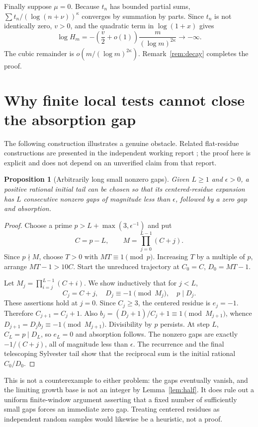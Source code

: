 \documentclass[11pt,a4paper]{article}
\newtheorem{proposition}[theorem]{Proposition}
\theoremstyle{remark}\newtheorem{remark}[theorem]{Remark}
\begin{document}
Finally suppose $\mu=0$. Because $t_n$ has bounded partial sums,
$\sum t_n/(\log(n+\nu))^\kappa$ converges by summation by parts.
Since $t_n$ is not identically zero, $v>0$, and the quadratic term in
$\log(1+x)$ gives
\[
 \log H_m=-\left(\frac v2+o(1)\right)
                  \frac m{(\log m)^{2\kappa}}\longrightarrow-\infty.
\]
The cubic remainder is $o(m/(\log m)^{2\kappa})$.
Remark~\ref{rem:decay} completes the proof.

\section{Why finite local tests cannot close the absorption gap}
The following construction illustrates a genuine obstacle. Related
flat-residue constructions are presented in the independent working report
\cite{flat}; the proof here is explicit and does not depend on an unverified
claim from that report.

\begin{proposition}[Arbitrarily long small nonzero gaps]\label{prop:flat}
Given $L\ge1$ and $\epsilon>0$, a positive rational initial tail can be
chosen so that its centered-residue expansion has $L$ consecutive nonzero
gaps of magnitude less than $\epsilon$, followed by a zero gap and absorption.
\end{proposition}
\begin{proof}
Choose a prime $p>L+\max(3,\epsilon^{-1})$ and put
\[
 C=p-L,\qquad M=\prod_{j=0}^{L-1}(C+j).
\]
Since $p\nmid M$, choose $T>0$ with $MT\equiv1\pmod p$.
Increasing $T$ by a multiple of $p$, arrange $MT-1>10C$.
Start the unreduced trajectory at $C_0=C$, $D_0=MT-1$.

Let $M_j=\prod_{i=j}^{L-1}(C+i)$. We show inductively that for $j<L$,
\[
 C_j=C+j,\quad D_j\equiv-1\pmod{M_j},\quad p\mid D_j.
\]
These assertions hold at $j=0$. Since $C_j\ge3$, the centered residue is
$e_j=-1$. Therefore $C_{j+1}=C_j+1$. Also
$b_j=(D_j+1)/C_j+1\equiv1\pmod{M_{j+1}}$, whence
$D_{j+1}=D_jb_j\equiv-1\pmod{M_{j+1}}$. Divisibility by $p$ persists.
At step $L$, $C_L=p\mid D_L$, so $e_L=0$ and absorption follows.
The nonzero gaps are exactly $-1/(C+j)$, all of magnitude less than
$\epsilon$. The recurrence and the final telescoping Sylvester tail show
that the reciprocal sum is the initial rational $C_0/D_0$.
\end{proof}

This is not a counterexample to either problem: the gaps eventually vanish,
and the limiting growth base is not an integer by Lemma~\ref{lem:half}.
It does rule out a uniform finite-window argument asserting that a fixed
number of sufficiently small gaps forces an immediate zero gap. Treating
centered residues as independent random samples would likewise be a
heuristic, not a proof.
\end{document}
